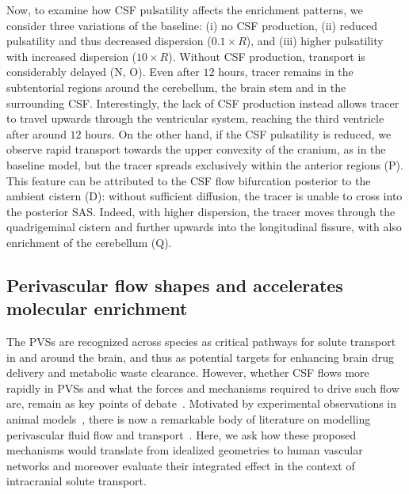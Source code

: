 \documentclass[fleqn,10pt]{wlscirep}
\begin{document}
Now, to examine how CSF pulsatility affects the enrichment patterns,
we consider three variations of the baseline: (i) no CSF production,
(ii) reduced pulsatility and thus decreased dispersion ($0.1 \times
R$), and (iii) higher pulsatility with increased dispersion ($10
\times R$). Without CSF production, transport is considerably delayed
(N, O). Even after $12$ hours, tracer remains in the
subtentorial regions around the cerebellum, the brain stem and in the
surrounding CSF. Interestingly, the lack of CSF production instead
allows tracer to travel upwards through the ventricular system,
reaching the third ventricle after around $12$ hours. On the other
hand, if the CSF pulsatility is reduced, we observe rapid transport
towards the upper convexity of the cranium, as in the baseline model,
but the tracer spreads exclusively within the anterior regions
(P). This feature can be attributed to the CSF flow
bifurcation posterior to the ambient cistern (D):
without sufficient diffusion, the tracer is unable to cross into the
posterior SAS. Indeed, with higher dispersion, the tracer moves
through the quadrigeminal cistern and further upwards into the
longitudinal fissure, with also enrichment of the cerebellum
(Q).

\subsection*{Perivascular flow shapes and accelerates molecular enrichment}
\label{sec:pvs_flow_results}

The PVSs are recognized across species as critical pathways for solute
transport in and around the brain\cite{}, and thus as potential
targets for enhancing brain drug delivery and metabolic waste
clearance\cite{}. However, whether CSF flows more rapidly in PVSs and
what the forces and mechanisms required to drive such flow are, remain
as key points of debate~\cite{bohr2022glymphatic,
  van2024caa}. Motivated by experimental observations in animal
models~\cite{iliff2012paravascular, iliff2013cerebral, mestre2018flow,
  bedussi2018paravascular}, there is now a remarkable body of
literature on modelling perivascular fluid flow and
transport~\cite{bilston2003arterial, asgari2016glymphatic,
  rey2018pulsatile, daversin2020mechanisms, sharp2019dispersion,
  thomas2019fluid, kedarasetti2020functional, kedarasetti2020arterial,
  troyetsky2021dispersion, martinac2021phase, gjerde2023directional,
  nozaleda2024arterial}. Here, we ask how these proposed mechanisms
would translate from idealized geometries to human vascular networks
and moreover evaluate their integrated effect in the context of
intracranial solute transport.
\end{document}
